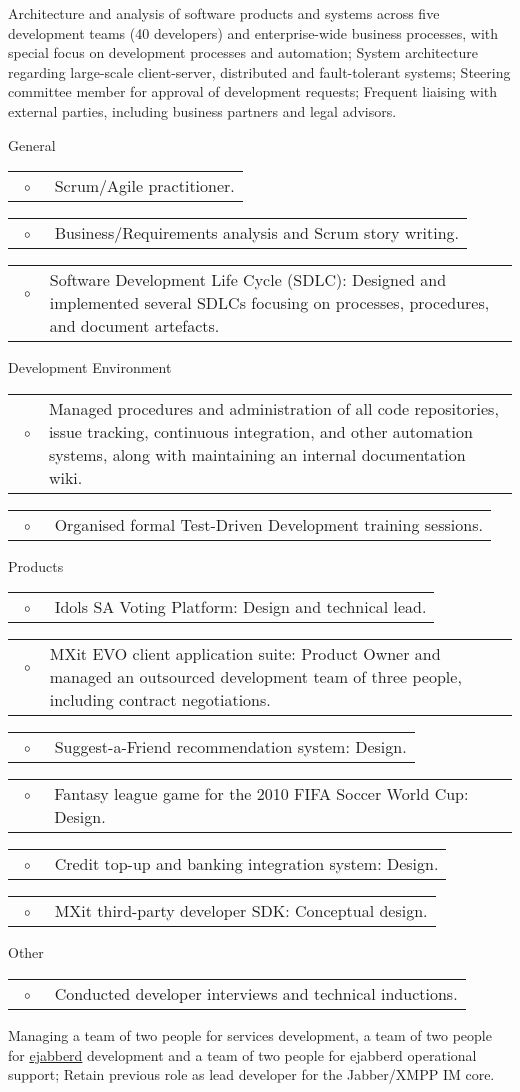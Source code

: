 \documentclass[10pt,a4paper,final]{columncv}
\makeatletter
\newcommand{\cvitembullet}[1]{%
  \begin{tabularx}{\linewidth}{@{}l@{\hspace{0.1em}}X@{}}
    ~$\circ$~ & #1 \\
  \end{tabularx}%
}
\makeatother
\begin{document}
\pagebreak

\begin{cvenv}
         {Architecture and analysis of software products and systems across five
          development teams (40 developers) and enterprise-wide business processes, with
          special focus on development processes and automation; System architecture
          regarding large-scale client-server, distributed and fault-tolerant systems;
          Steering committee member for approval of development requests; Frequent
          liaising with external parties, including business partners and legal advisors.}
         {General
            \cvitembullet{Scrum/Agile practitioner.}
            \cvitembullet{Business/Requirements analysis and Scrum story writing.}
            \cvitembullet{Software Development Life Cycle (SDLC): Designed and implemented
            several SDLCs focusing on processes, procedures, and document artefacts.}
          Development Environment
            \cvitembullet{Managed procedures and administration of all code repositories, issue
             tracking, continuous integration, and other automation systems, along with
             maintaining an internal documentation wiki.}
            \cvitembullet{Organised formal Test-Driven Development training sessions.}
          Products
            \cvitembullet{Idols SA Voting Platform: Design and technical lead.}
            \cvitembullet{MXit EVO client application suite: Product Owner and managed an
             outsourced development team of three people, including contract negotiations.}
            \cvitembullet{Suggest-a-Friend recommendation system: Design.}
            \cvitembullet{Fantasy league game for the 2010 FIFA Soccer World Cup: Design.}
            \cvitembullet{Credit top-up and banking integration system: Design.}
            \cvitembullet{MXit third-party developer SDK: Conceptual design.}
          Other
            \cvitembullet{Conducted developer interviews and technical inductions.}
         }
         {Managing a team of two people for services development, a team of two people for
          \href{http://www.process-one.net/en/ejabberd/}{ejabberd} development and a team
          of two people for ejabberd operational support;
          Retain previous role as lead developer for the Jabber/XMPP IM core.}

\end{cvenv}
\end{document}
